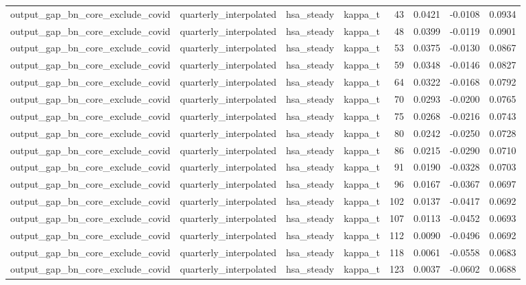 \begin{tabular}{llllrrrr}
output\_gap\_bn\_core\_exclude\_covid & quarterly\_interpolated & hsa\_steady & kappa\_t & 43 & 0.0421 & -0.0108 & 0.0934 \\
output\_gap\_bn\_core\_exclude\_covid & quarterly\_interpolated & hsa\_steady & kappa\_t & 48 & 0.0399 & -0.0119 & 0.0901 \\
output\_gap\_bn\_core\_exclude\_covid & quarterly\_interpolated & hsa\_steady & kappa\_t & 53 & 0.0375 & -0.0130 & 0.0867 \\
output\_gap\_bn\_core\_exclude\_covid & quarterly\_interpolated & hsa\_steady & kappa\_t & 59 & 0.0348 & -0.0146 & 0.0827 \\
output\_gap\_bn\_core\_exclude\_covid & quarterly\_interpolated & hsa\_steady & kappa\_t & 64 & 0.0322 & -0.0168 & 0.0792 \\
output\_gap\_bn\_core\_exclude\_covid & quarterly\_interpolated & hsa\_steady & kappa\_t & 70 & 0.0293 & -0.0200 & 0.0765 \\
output\_gap\_bn\_core\_exclude\_covid & quarterly\_interpolated & hsa\_steady & kappa\_t & 75 & 0.0268 & -0.0216 & 0.0743 \\
output\_gap\_bn\_core\_exclude\_covid & quarterly\_interpolated & hsa\_steady & kappa\_t & 80 & 0.0242 & -0.0250 & 0.0728 \\
output\_gap\_bn\_core\_exclude\_covid & quarterly\_interpolated & hsa\_steady & kappa\_t & 86 & 0.0215 & -0.0290 & 0.0710 \\
output\_gap\_bn\_core\_exclude\_covid & quarterly\_interpolated & hsa\_steady & kappa\_t & 91 & 0.0190 & -0.0328 & 0.0703 \\
output\_gap\_bn\_core\_exclude\_covid & quarterly\_interpolated & hsa\_steady & kappa\_t & 96 & 0.0167 & -0.0367 & 0.0697 \\
output\_gap\_bn\_core\_exclude\_covid & quarterly\_interpolated & hsa\_steady & kappa\_t & 102 & 0.0137 & -0.0417 & 0.0692 \\
output\_gap\_bn\_core\_exclude\_covid & quarterly\_interpolated & hsa\_steady & kappa\_t & 107 & 0.0113 & -0.0452 & 0.0693 \\
output\_gap\_bn\_core\_exclude\_covid & quarterly\_interpolated & hsa\_steady & kappa\_t & 112 & 0.0090 & -0.0496 & 0.0692 \\
output\_gap\_bn\_core\_exclude\_covid & quarterly\_interpolated & hsa\_steady & kappa\_t & 118 & 0.0061 & -0.0558 & 0.0683 \\
output\_gap\_bn\_core\_exclude\_covid & quarterly\_interpolated & hsa\_steady & kappa\_t & 123 & 0.0037 & -0.0602 & 0.0688 \\

\end{tabular}
